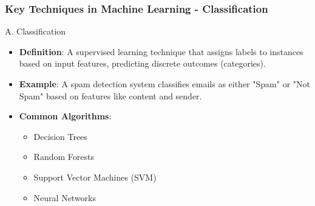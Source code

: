 \documentclass[aspectratio=169]{beamer}
\begin{document}
\begin{frame}[fragile]
    \frametitle{Key Techniques in Machine Learning - Classification}
    \begin{block}{A. Classification}
        \begin{itemize}
            \item \textbf{Definition}: A supervised learning technique that assigns labels to instances based on input features, predicting discrete outcomes (categories).
            \item \textbf{Example}: A spam detection system classifies emails as either "Spam" or "Not Spam" based on features like content and sender.
            \item \textbf{Common Algorithms}: 
                \begin{itemize}
                    \item Decision Trees
                    \item Random Forests
                    \item Support Vector Machines (SVM)
                    \item Neural Networks
                \end{itemize}
        \end{itemize}
    \end{block}
\end{frame}
\end{document}
